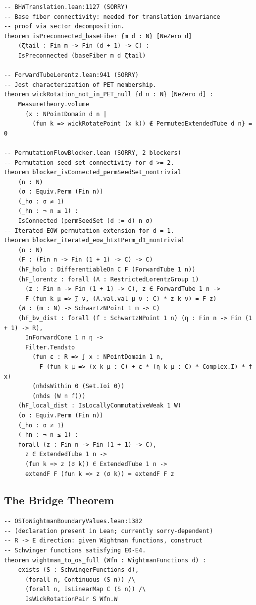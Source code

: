 \documentclass[11pt,a4paper]{article}
\begin{document}
\begin{lstlisting}[style=leansorry]
-- BHWTranslation.lean:1127 (SORRY)
-- Base fiber connectivity: needed for translation invariance
-- proof via sector decomposition.
theorem isPreconnected_baseFiber {m d : N} [NeZero d]
    (ζtail : Fin m -> Fin (d + 1) -> C) :
    IsPreconnected (baseFiber m d ζtail)

-- ForwardTubeLorentz.lean:941 (SORRY)
-- Jost characterization of PET membership.
theorem wickRotation_not_in_PET_null {d n : N} [NeZero d] :
    MeasureTheory.volume
      {x : NPointDomain d n |
        (fun k => wickRotatePoint (x k)) ∉ PermutedExtendedTube d n} = 0

-- PermutationFlowBlocker.lean (SORRY, 2 blockers)
-- Permutation seed set connectivity for d >= 2.
theorem blocker_isConnected_permSeedSet_nontrivial
    (n : N)
    (σ : Equiv.Perm (Fin n))
    (_hσ : σ ≠ 1)
    (_hn : ¬ n ≤ 1) :
    IsConnected (permSeedSet (d := d) n σ)
-- Iterated EOW permutation extension for d = 1.
theorem blocker_iterated_eow_hExtPerm_d1_nontrivial
    (n : N)
    (F : (Fin n -> Fin (1 + 1) -> C) -> C)
    (hF_holo : DifferentiableOn C F (ForwardTube 1 n))
    (hF_lorentz : forall (Λ : RestrictedLorentzGroup 1)
      (z : Fin n -> Fin (1 + 1) -> C), z ∈ ForwardTube 1 n ->
      F (fun k μ => ∑ ν, (Λ.val.val μ ν : C) * z k ν) = F z)
    (W : (m : N) -> SchwartzNPoint 1 m -> C)
    (hF_bv_dist : forall (f : SchwartzNPoint 1 n) (η : Fin n -> Fin (1 + 1) -> R),
      InForwardCone 1 n η ->
      Filter.Tendsto
        (fun ε : R => ∫ x : NPointDomain 1 n,
          F (fun k μ => (x k μ : C) + ε * (η k μ : C) * Complex.I) * f x)
        (nhdsWithin 0 (Set.Ioi 0))
        (nhds (W n f)))
    (hF_local_dist : IsLocallyCommutativeWeak 1 W)
    (σ : Equiv.Perm (Fin n))
    (_hσ : σ ≠ 1)
    (_hn : ¬ n ≤ 1) :
    forall (z : Fin n -> Fin (1 + 1) -> C),
      z ∈ ExtendedTube 1 n ->
      (fun k => z (σ k)) ∈ ExtendedTube 1 n ->
      extendF F (fun k => z (σ k)) = extendF F z
\end{lstlisting}

\subsection{The Bridge Theorem}

\begin{lstlisting}
-- OSToWightmanBoundaryValues.lean:1382
-- (declaration present in Lean; currently sorry-dependent)
-- R -> E direction: given Wightman functions, construct
-- Schwinger functions satisfying E0-E4.
theorem wightman_to_os_full (Wfn : WightmanFunctions d) :
    exists (S : SchwingerFunctions d),
      (forall n, Continuous (S n)) /\
      (forall n, IsLinearMap C (S n)) /\
      IsWickRotationPair S Wfn.W
\end{lstlisting}
\end{document}
